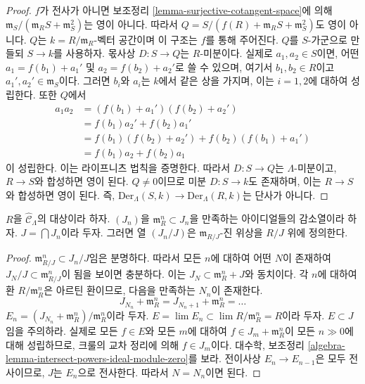\begin{proof}
$f$가 전사가 아니면 보조정리
\ref{lemma-surjective-cotangent-space}에 의해
$\mathfrak m_S/(\mathfrak m_R S + \mathfrak m_S^2)$는 영이 아니다.
따라서 $Q = S/(f(R) + \mathfrak m_R S + \mathfrak m_S^2)$도 영이 아니다.
$Q$는 $k = R/\mathfrak m_R$-벡터 공간이며 이 구조는 $f$를 통해 주어진다.
$Q$를 $S$-가군으로 만들되 $S \to k$를 사용하자. 몫사상
$D : S \to Q$는 $R$-미분이다. 실제로 $a_1, a_2 \in S$이면,
어떤 $a_1 = f(b_1) + a_1'$ 및 $a_2 = f(b_2) + a_2'$로 쓸 수 있으며,
여기서 $b_1, b_2 \in R$이고 $a_1', a_2' \in \mathfrak m_S$이다.
그러면 $b_i$와 $a_i$는 $k$에서 같은 상을 가지며, 이는
$i = 1, 2$에 대하여 성립한다. 또한
$Q$에서
\begin{align*}
a_1a_2 & = (f(b_1) + a_1')(f(b_2) + a_2') \\
& = f(b_1)a_2' + f(b_2)a_1' \\
& = f(b_1)(f(b_2) + a_2') + f(b_2)(f(b_1) + a_1') \\
& = f(b_1)a_2 + f(b_2)a_1
\end{align*}
이 성립한다. 이는 라이프니츠 법칙을 증명한다.
따라서 $D : S \to Q$는 $\Lambda$-미분이고, $R \to S$와 합성하면
영이 된다. $Q \not = 0$이므로 미분 $D : S \to k$도 존재하며,
이는 $R \to S$와 합성하면 영이 된다. 즉,
$\text{Der}_\Lambda(S, k) \to \text{Der}_\Lambda(R, k)$는 단사가 아니다.
\end{proof}

\begin{lemma}
\label{lemma-m-adic-topology}
$R$을 $\widehat{\mathcal{C}}_\Lambda$의 대상이라 하자.
$(J_n)$을 $\mathfrak m_R^n \subset J_n$을 만족하는 아이디얼들의
감소열이라 하자. $J = \bigcap J_n$이라 두자. 그러면 열 $(J_n/J)$은
$\mathfrak m_{R/J}$-진 위상을 $R/J$ 위에 정의한다.
\end{lemma}

\begin{proof}
$\mathfrak m_{R/J}^n \subset J_n/J$임은 분명하다.
따라서 모든 $n$에 대하여 어떤 $N$이 존재하여
$J_N/J \subset \mathfrak m_{R/J}^n$이 됨을 보이면
충분하다. 이는 $J_N \subset \mathfrak m_R^n + J$와 동치이다.
각 $n$에 대하여 환 $R/\mathfrak m_R^n$은 아르틴 환이므로,
다음을 만족하는 $N_n$이 존재한다.
$$
J_{N_n} + \mathfrak m_R^n = J_{N_n + 1} + \mathfrak m_R^n = \ldots
$$
$E_n = (J_{N_n} + \mathfrak m_R^n)/\mathfrak m_R^n$이라 두자.
$E = \lim E_n \subset \lim R/\mathfrak m_R^n = R$이라 두자.
$E \subset J$임을 주의하라. 실제로 모든 $f \in E$와 모든 $m$에 대하여
$f \in J_m + \mathfrak m_R^n$이 모든 $n \gg 0$에 대해 성립하므로,
크룰의 교차 정리에 의해 $f \in J_m$이다. 대수학, 보조정리
\ref{algebra-lemma-intersect-powers-ideal-module-zero}를 보라.
전이사상 $E_n \to E_{n - 1}$은 모두 전사이므로,
$J$는 $E_n$으로 전사한다.
따라서 $N = N_n$이면 된다.
\end{proof}

